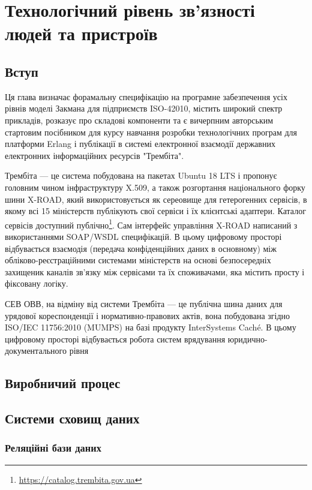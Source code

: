\chapter{Технологічний рівень зв'язності людей та пристроїв}

\section{Вступ}

Ця глава визначає форамальну специфікацію на програмне забезпечення усіх рівнів моделі Закмана
для підприємств ISO-42010, містить широкий спектр прикладів, розказує про складові компоненти
та є вичерпним авторським стартовим посібником для курсу навчання розробки
технологічних програм для платформи Erlang і публікації в системі електронної взаємодії
державних електронних інформаційних ресурсів "Трембіта".

Трембіта — це система побудована на пакетах Ubuntu 18 LTS і пропонує головним чином
інфраструктуру X.509, а також розгортання національного форку шини X-ROAD,
який використовується як сереовище для гетерогенних сервісів, в якому всі 15 міністерств
публікують свої сервіси і їх клієнтські адаптери. Каталог сервісів доступний
публічно\footnote{\url{https://catalog.trembita.gov.ua}}. Сам інтерфейс управління X-ROAD
написаний з використаннями SOAP/WSDL специфікацій. В цьому цифровому просторі відбувається
взаємодія (передача конфіденційних даних в основному) між обліково-реєстраційними системами
міністерств на основі безпосередніх захищеник каналів зв'язку між сервісами та їх споживачами,
яка містить просту і фіксовану логіку.

СЕВ ОВВ, на відміну від системи Трембіта — це публічна шина даних для
урядової кореспонденції і нормативно-правових актів, вона побудована
згідно ISO/IEC 11756:2010 (MUMPS) на базі продукту InterSystems Caché.
В цьому цифровому просторі відбувається робота систем врядування
юридично-документального рівня

\section{Виробничий процес}

\section{Системи сховищ даних}

\subsection{Реляційні бази даних}

